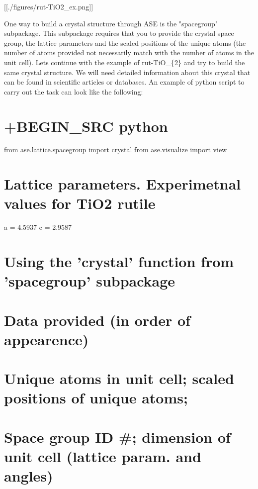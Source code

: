 \documentclass[11pt]{article}
\begin{document}
{[}{[}./figures/rut-TiO2\_ex.png{]}{]}

One way to build a crystal structure through ASE is the "spacegroup"
subpackage. This subpackage requires that you to provide the crystal
space group, the lattice parameters and the scaled positions of the
unique atoms (the number of atoms provided not necessarily match with
the number of atoms in the unit cell). Lets continue with the example of
rut-TiO\_\{2\} and try to build the same crystal structure. We will need
detailed information about this crystal that can be found in scientific
articles or databases. An example of python script to carry out the task
can look like the following:

\section{+BEGIN\_SRC python}\label{begin_src-python-3}

from ase.lattice.spacegroup import crystal from ase.visualize import
view

\section{Lattice parameters. Experimetnal values for TiO2
rutile}\label{lattice-parameters.-experimetnal-values-for-tio2-rutile}

a = 4.5937 c = 2.9587

\section{Using the 'crystal' function from 'spacegroup'
subpackage}\label{using-the-crystal-function-from-spacegroup-subpackage}

\section{Data provided (in order of
appearence)}\label{data-provided-in-order-of-appearence}

\section{Unique atoms in unit cell; scaled positions of unique
atoms;}\label{unique-atoms-in-unit-cell-scaled-positions-of-unique-atoms}

\section{Space group ID \#; dimension of unit cell (lattice param. and
angles)}\label{space-group-id-dimension-of-unit-cell-lattice-param.-and-angles}
\end{document}
